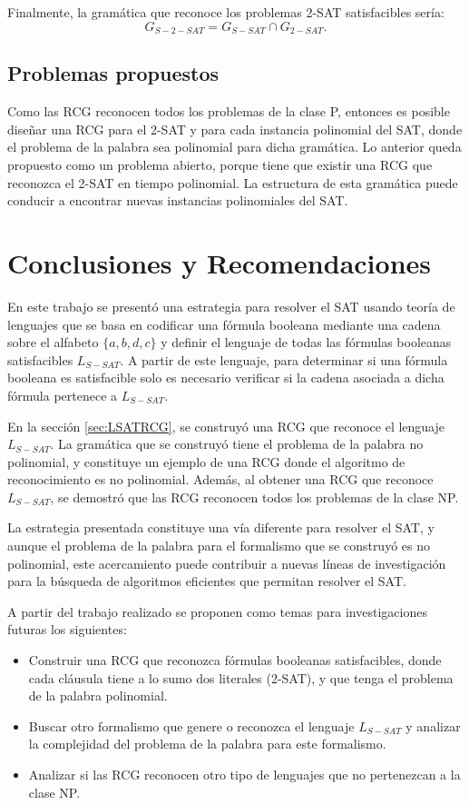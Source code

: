 \documentclass{article}
\begin{document}
Finalmente, la gramática que reconoce los problemas 2-SAT satisfacibles sería:
$$G_{S-2-SAT}=G_{S-SAT}\cap G_{2-SAT}.$$

\subsection{Problemas propuestos}

Como las RCG reconocen todos los problemas de la clase P, entonces es posible diseñar una RCG para el 2-SAT y para cada instancia polinomial del SAT, donde el problema de la palabra sea polinomial para dicha gramática.  Lo anterior queda propuesto como un problema abierto, porque tiene que existir una RCG que reconozca el 2-SAT en tiempo polinomial. La estructura de esta gramática puede conducir a encontrar nuevas instancias polinomiales del SAT.

\section{Conclusiones y Recomendaciones}

En este trabajo se presentó una estrategia para resolver el SAT usando teoría de lenguajes que se basa en
codificar una fórmula booleana mediante una cadena sobre el alfabeto $\{a,b,d,c\}$ y definir el lenguaje de
todas las fórmulas booleanas satisfacibles $L_{S-SAT}$. A partir de este lenguaje, para determinar si una
fórmula booleana es satisfacible solo es necesario verificar si la cadena asociada a dicha fórmula pertenece
a $L_{S-SAT}$.

En la sección \ref{sec:LSATRCG}, se construyó una RCG que reconoce el lenguaje $L_{S-SAT}$. La gramática que se construyó tiene el
problema de la palabra no polinomial, y constituye un ejemplo de una RCG donde el algoritmo de reconocimiento
es no polinomial.  Además, al obtener una RCG que reconoce $L_{S-SAT}$, se demostró que las
RCG reconocen todos los problemas de la clase NP.

La estrategia presentada constituye una vía diferente para resolver el SAT, y aunque el problema de
la palabra para el formalismo que se construyó es no polinomial, este acercamiento puede contribuir a nuevas
líneas de investigación para la búsqueda de algoritmos eficientes que permitan resolver el SAT.

A partir del trabajo realizado se proponen como temas para investigaciones futuras los
siguientes:

\begin{itemize}
    \item Construir una RCG que reconozca fórmulas booleanas satisfacibles, donde cada cláusula tiene a lo sumo dos literales (2-SAT), y que tenga el problema de la palabra polinomial.
    \item Buscar otro formalismo que genere o reconozca el lenguaje $L_{S-SAT}$ y analizar la complejidad del problema de la palabra para este formalismo.
    \item Analizar si las RCG reconocen otro tipo de lenguajes que no pertenezcan a la clase NP.
\end{itemize}
\end{document}
